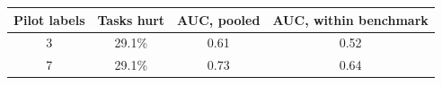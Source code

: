\begin{tabular}{cccc}
\toprule
Pilot labels & Tasks hurt & AUC, pooled & AUC, within benchmark \\
\midrule
3 & 29.1\% & 0.61 & 0.52 \\
7 & 29.1\% & 0.73 & 0.64 \\
\bottomrule
\end{tabular}
